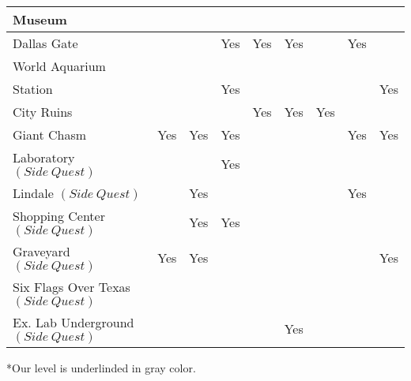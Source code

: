 \begin{center}
\begin{tabular}[c]{| p{3.8cm} | p{1cm} | p{1cm} | p{1cm} | p{1cm} | p{1.7cm} | p{1cm} | p{1cm} | p{1cm} | }
		                 Museum                   &          &          &          &           &                 &          &             &            \\ \hline
		               Dallas Gate                &          &          &   Yes       &    Yes       &      Yes           &          &    Yes         &            \\ \hline
		             World Aquarium               &          &          &          &           &                 &          &             &            \\ \hline
		                 Station                  &          &          & Yes      &           &                 &          &             & Yes        \\ \hline
		               City Ruins                 &          &          &          & Yes       & Yes             & Yes      &             &            \\ \hline
		\rowcolor{light-light-gray}
		Giant Chasm & Yes      & Yes      & Yes      &           &                 &          & Yes         & Yes        \\ \hline
		       Laboratory $(Side\:Quest)$         &          &          & Yes      &           &                 &          &          &         \\ \hline
		         Lindale $(Side\:Quest)$          &          & Yes      &          &           &                 &          & Yes         &         \\ \hline
		     Shopping Center $(Side\:Quest)$      &          & Yes         & Yes      &           &                 &          &             &            \\ \hline
		        Graveyard $(Side\:Quest)$         &  Yes        &   Yes       &          &           &                 &          &             & Yes        \\ \hline
		  Six Flags Over Texas $(Side\:Quest)$    &          &          &          &           &                 &          &             &            \\ \hline
		   Ex. Lab Underground $(Side\:Quest)$    &          &       &          &           &    Yes             &          &          &         \\ \hline
	\end{tabular}
\end{center}

\vspace*{0.2cm}

*Our level is underlinded in gray color.

